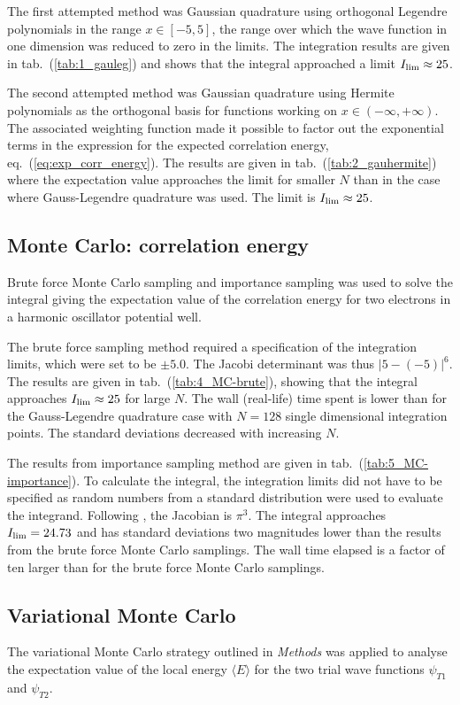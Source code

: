\documentclass[a4paper,11pt]{article}
\begin{document}
The first attempted method was Gaussian quadrature using orthogonal Legendre polynomials in the range $x\in[-5,5]$, the range over which the wave function in one dimension was reduced to zero in the limits. The integration results are given in tab.~(\ref{tab:1_gauleg}) and shows that the integral approached a limit $I_{\rm lim} \approx 25$. 

The second attempted method was Gaussian quadrature using Hermite polynomials as the orthogonal basis for functions working on $x\in (-\infty,+\infty)$. The associated weighting function made it possible to factor out the exponential terms in the expression for the expected correlation energy, eq.~(\ref{eq:exp_corr_energy}). The results are given in tab.~(\ref{tab:2_gauhermite}) where the expectation value approaches the limit for smaller $N$ than in the case where Gauss-Legendre quadrature was used. The limit is $I_{\rm lim} \approx 25$.

\subsection{Monte Carlo: correlation energy}
Brute force Monte Carlo sampling and importance sampling was used to solve the integral giving the expectation value of the correlation energy for two electrons in a harmonic oscillator potential well.

The brute force sampling method required a specification of the integration limits, which were set to be $\pm5.0$. The Jacobi determinant was thus $|5-(-5)|^6$. The results are given in tab.~(\ref{tab:4_MC-brute}), showing that the integral approaches $I_{\rm lim} \approx 25$ for large $N$. The wall (real-life) time spent is lower than for the Gauss-Legendre quadrature case with $N=128$ single dimensional integration points. The standard deviations decreased with increasing $N$. 

The results from importance sampling method are given in tab.~(\ref{tab:5_MC-importance}). To calculate the integral, the integration limits did not have to be specified as random numbers from a standard distribution were used to evaluate the integrand. Following \cite{MHJ:2013}, the Jacobian is $\pi^3$. The integral approaches $I_{\rm lim} = 24.73$ and has standard deviations two magnitudes lower than the results from the brute force Monte Carlo samplings. The wall time elapsed is a factor of ten larger than for the brute force Monte Carlo samplings.

\subsection{Variational Monte Carlo}
The variational Monte Carlo strategy outlined in \textit{Methods} was applied to analyse the expectation value of the local energy $\langle E \rangle$ for the two trial wave functions $\psi_{T1}$ and $\psi_{T2}$. 
\end{document}
